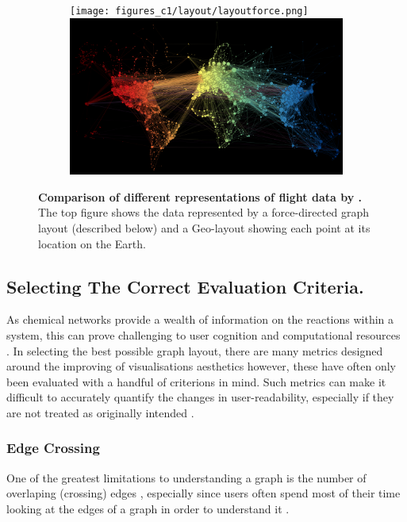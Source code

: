  
\begin{figure}[H]
     \centering 
      \begin{subfigure}[b,black]{.9\textwidth}
         \centering 
     \texttt{[image: figures\_c1/layout/layoutforce.png]}
     \includegraphics[width=\textwidth]{figures_c1/layout/layoutgeo.png}
     \end{subfigure}
        \caption{\textbf{Comparison of different representations of flight data by \citep{worldmap}.} The top figure shows the data represented by a force-directed graph layout (described below) and a Geo-layout showing each point at its location on the Earth.}
        \label{fig:worldmap}
\end{figure}


\subsection{Selecting The Correct Evaluation Criteria.}
As chemical networks provide a wealth of information on the reactions within a system, this can prove challenging to user cognition and computational resources \citep{ch1}. In selecting the best possible graph layout, there are many metrics designed around the improving of visualisations aesthetics \citep{metricgraphaesthetics} however, these have often only been evaluated with a handful of criterions in mind. Such metrics can make it difficult to accurately quantify the changes in user-readability, especially if they are not treated as originally intended \citep{eyetrack}. 


\subsubsection{Edge Crossing} \label{sec:edgecross}
One of the greatest limitations to understanding a graph is the number of overlaping (crossing) edges \citep{humanaesthetic}, especially since users often spend most of their time looking at the edges of a graph in order to understand it \citep{eyetrack}. 

